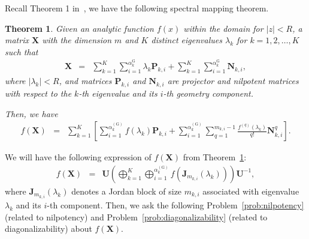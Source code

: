 \documentclass[11pt]{article}
\newtheorem{theorem}{Theorem}
\begin{document}
Recall Theorem 1 in~\cite{chang2024operatorChar}, we have the following spectral mapping theorem. 
%
\begin{theorem}\label{thm: Spectral Mapping Theorem for Single Variable}
% 
Given an analytic function $f(x)$ within the domain for $|z| < R$, a matrix $\bm{X}$ with the dimension $m$ and $K$ distinct eigenvalues $\lambda_k$ for $k=1,2,\ldots,K$ such that
%
\begin{eqnarray}\label{eq1: thm: Spectral Mapping Theorem for Single Variable}
\bm{X}&=&\sum\limits_{k=1}^K\sum\limits_{i=1}^{\alpha_k^{\mathrm{G}}} \lambda_k \bm{P}_{k,i}+
\sum\limits_{k=1}^K\sum\limits_{i=1}^{\alpha_k^{\mathrm{G}}} \bm{N}_{k,i},
\end{eqnarray}
%
where $\left\vert\lambda_k\right\vert<R$, and matrices $\bm{P}_{k,i}$ and $\bm{N}_{k,i}$ are projector and nilpotent matrices with respect to the $k$-th eigenvalue and its $i$-th geometry component. 

Then, we have
%   
\begin{eqnarray}\label{eq2: thm: Spectral Mapping Theorem for Single Variable}
f(\bm{X})&=&\sum\limits_{k=1}^K \left[\sum\limits_{i=1}^{\alpha_k^{(\mathrm{G})}}f(\lambda_k)\bm{P}_{k,i}+\sum\limits_{i=1}^{\alpha_k^{(\mathrm{G})}}\sum\limits_{q=1}^{m_{k,i}-1}\frac{f^{(q)}(\lambda_k)}{q!}\bm{N}_{k,i}^q\right].
\end{eqnarray}
%
\end{theorem}

We will have the following expression of $f(\bm{X})$ from Theorem~\ref{thm: Spectral Mapping Theorem for Single Variable}:
%
\begin{eqnarray}\label{eq2: matrix setup GDO for Nilpotent}
f(\bm{X})&=& \bm{U}\left(\bigoplus\limits_{k=1}^{K}\bigoplus\limits_{i=1}^{\alpha_{k}^{(\mathrm{G})}}f(\bm{J}_{m_{k,i}}(\lambda_{k}))\right)\bm{U}^{-1},
\end{eqnarray}
%
where $\bm{J}_{m_{k,i}}(\lambda_{k})$ denotes a Jordan block of size $m_{k,i}$ associated with eigenvalue $\lambda_k$ and its $i$-th component. Then, we ask the following Problem~\ref{prob:nilpotency} (related to nilpotency) and Problem~\ref{prob:diagonalizability} (related to diagonalizability) about $f(\bm{X})$.
\end{document}
